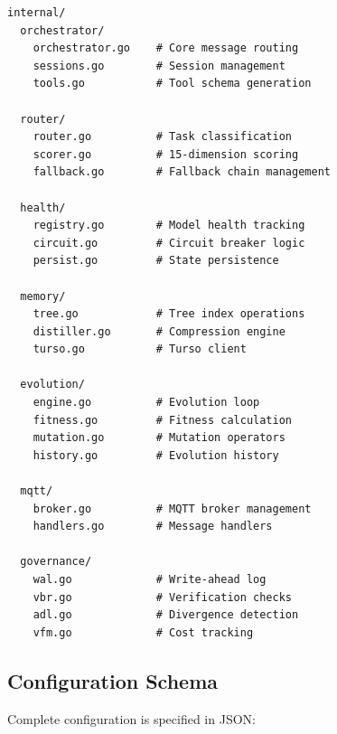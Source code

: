 \documentclass[conference]{IEEEtran}
\begin{document}
\begin{lstlisting}[basicstyle=\ttfamily\footnotesize]
internal/
  orchestrator/
    orchestrator.go    # Core message routing
    sessions.go        # Session management
    tools.go           # Tool schema generation
    
  router/
    router.go          # Task classification
    scorer.go          # 15-dimension scoring
    fallback.go        # Fallback chain management
    
  health/
    registry.go        # Model health tracking
    circuit.go         # Circuit breaker logic
    persist.go         # State persistence
    
  memory/
    tree.go            # Tree index operations
    distiller.go       # Compression engine
    turso.go           # Turso client
    
  evolution/
    engine.go          # Evolution loop
    fitness.go         # Fitness calculation
    mutation.go        # Mutation operators
    history.go         # Evolution history
    
  mqtt/
    broker.go          # MQTT broker management
    handlers.go        # Message handlers
    
  governance/
    wal.go             # Write-ahead log
    vbr.go             # Verification checks
    adl.go             # Divergence detection
    vfm.go             # Cost tracking
\end{lstlisting}

\subsection{Configuration Schema}

Complete configuration is specified in JSON:
\end{document}
